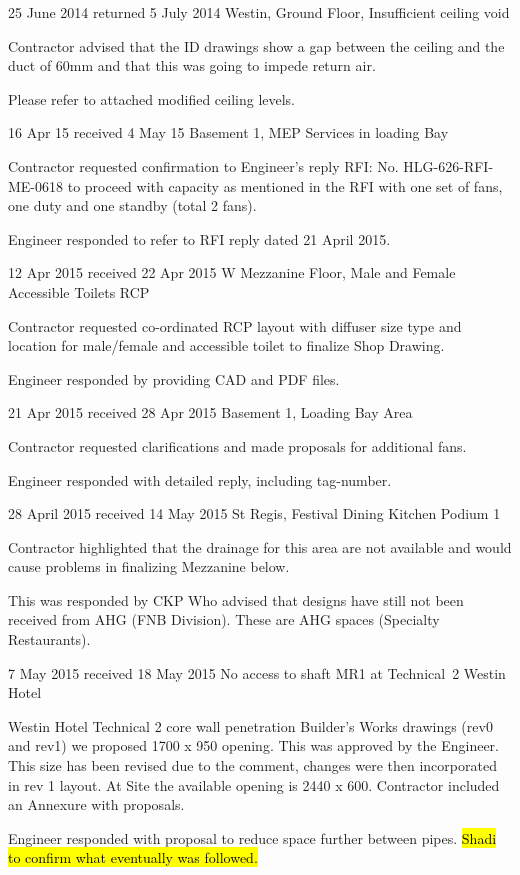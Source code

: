  {25 June 2014  returned 5 July 2014} {Westin, Ground Floor, Insufficient ceiling void}
{
   \item Contractor advised that the ID drawings show a gap between the ceiling and the duct of 60mm and that this was going to impede return air.
   \item Please refer to attached modified ceiling levels.
}

 {16 Apr 15 received 4 May 15 } {Basement 1, MEP Services in loading Bay}
{
  \item Contractor requested confirmation to Engineer's reply RFI: No. HLG-626-RFI-ME-0618 to proceed with capacity as mentioned in the RFI with one set of fans, one duty and one standby (total 2 fans). 
  \item Engineer responded to refer to RFI reply dated 21 April 2015.
}

 {12 Apr 2015 received 22 Apr 2015} {W Mezzanine Floor, Male and Female Accessible Toilets RCP}
  {
    \item Contractor requested co-ordinated RCP layout with diffuser size type and location for male/female and accessible toilet to finalize Shop Drawing.
   \item Engineer responded by providing CAD and PDF files. 
   
  }
  
  {21 Apr 2015 received 28 Apr 2015} {Basement 1, Loading Bay Area}
 {
   \item Contractor requested clarifications and made proposals for additional fans.
   \item Engineer responded with detailed reply, including tag-number. 
 }
 
 {28 April 2015 received 14 May 2015 } {St Regis, Festival Dining Kitchen Podium 1 }
 {
   \item Contractor highlighted that the drainage for this area are not available and would cause problems in finalizing Mezzanine below.
   \item This was responded by CKP Who advised that designs have still not been received from AHG (FNB Division). These are AHG spaces (Specialty Restaurants). \delay\delay\delay
 }


 {7 May 2015 received 18 May 2015} {No access to shaft MR1 at Technical~2 Westin Hotel}
{
  \item Westin Hotel Technical 2 core wall penetration Builder's Works drawings (rev0 and rev1) we proposed 1700 x 950   opening. This was approved by the Engineer. This size has been revised due to the comment, changes were then incorporated in rev 1 layout. At Site the available opening is 2440 x 600. Contractor included an Annexure with proposals.
  \item Engineer responded with proposal to reduce space further between pipes. \hl{Shadi to confirm what eventually was followed.}
}

